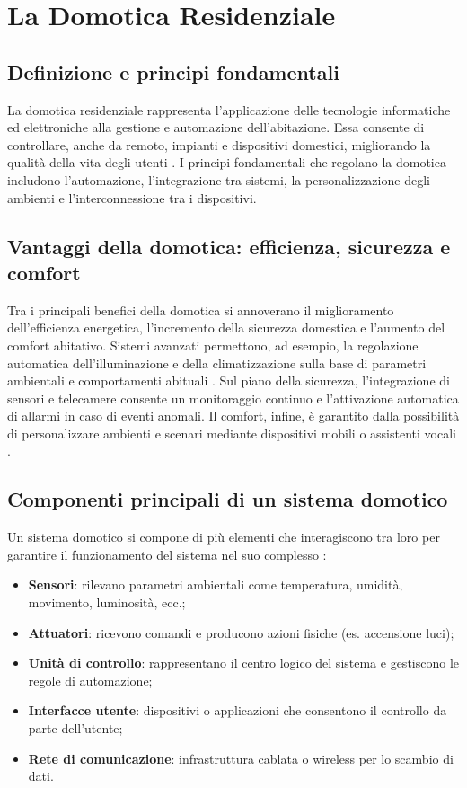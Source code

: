 \chapter{La Domotica Residenziale}
\section{Definizione e principi fondamentali}
La domotica residenziale rappresenta l’applicazione delle tecnologie informatiche ed elettroniche alla gestione e automazione dell’abitazione. Essa consente di controllare, anche da remoto, impianti e dispositivi domestici, migliorando la qualità della vita degli utenti \parencite{domoticaWiki}. I principi fondamentali che regolano la domotica includono l’automazione, l’integrazione tra sistemi, la personalizzazione degli ambienti e l’interconnessione tra i dispositivi.

\section{Vantaggi della domotica: efficienza, sicurezza e comfort}
Tra i principali benefici della domotica si annoverano il miglioramento dell’efficienza energetica, l’incremento della sicurezza domestica e l’aumento del comfort abitativo. Sistemi avanzati permettono, ad esempio, la regolazione automatica dell’illuminazione e della climatizzazione sulla base di parametri ambientali e comportamenti abituali \parencite{iecSmartHome}. Sul piano della sicurezza, l’integrazione di sensori e telecamere consente un monitoraggio continuo e l’attivazione automatica di allarmi in caso di eventi anomali. Il comfort, infine, è garantito dalla possibilità di personalizzare ambienti e scenari mediante dispositivi mobili o assistenti vocali \parencite{domoticaWiki}.

\section{Componenti principali di un sistema domotico}
Un sistema domotico si compone di più elementi che interagiscono tra loro per garantire il funzionamento del sistema nel suo complesso \parencite{iecSmartHome}:
\begin{itemize}
    \item \textbf{Sensori}: rilevano parametri ambientali come temperatura, umidità, movimento, luminosità, ecc.;
    \item \textbf{Attuatori}: ricevono comandi e producono azioni fisiche (es. accensione luci);
    \item \textbf{Unità di controllo}: rappresentano il centro logico del sistema e gestiscono le regole di automazione;
    \item \textbf{Interfacce utente}: dispositivi o applicazioni che consentono il controllo da parte dell’utente;
    \item \textbf{Rete di comunicazione}: infrastruttura cablata o wireless per lo scambio di dati.
\end{itemize}



